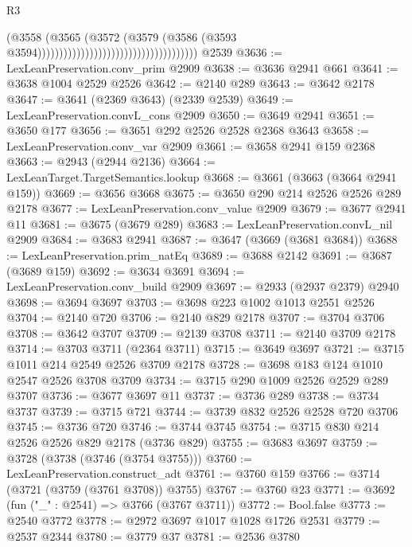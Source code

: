 \begin{lexlean}{R3}
\begin{coremodule}
                                                                  (@3558
                                                                    (@3565
                                                                      (@3572
                                                                        (@3579
                                                                          (@3586
                                                                            (@3593
                                                                              @3594)))))))))))))))))))))))))))))))))))))
    @2539
@3636 := LexLeanPreservation.conv_prim @2909
@3638 := @3636 @2941 @661
@3641 := @3638 @1004 @2529 @2526
@3642 := @2140 @289
@3643 := @3642 @2178
@3647 := @3641 (@2369 @3643) (@2339 @2539)
@3649 := LexLeanPreservation.convL_cons @2909
@3650 := @3649 @2941
@3651 := @3650 @177
@3656 := @3651 @292 @2526 @2528 @2368 @3643
@3658 := LexLeanPreservation.conv_var @2909
@3661 := @3658 @2941 @159 @2368
@3663 := @2943 (@2944 @2136)
@3664 := LexLeanTarget.TargetSemantics.lookup
@3668 := @3661 (@3663 (@3664 @2941 @159))
@3669 := @3656 @3668
@3675 := @3650 @290 @214 @2526 @2526 @289 @2178
@3677 := LexLeanPreservation.conv_value @2909
@3679 := @3677 @2941 @11
@3681 := @3675 (@3679 @289)
@3683 := LexLeanPreservation.convL_nil @2909
@3684 := @3683 @2941
@3687 := @3647 (@3669 (@3681 @3684))
@3688 := LexLeanPreservation.prim_natEq
@3689 := @3688 @2142
@3691 := @3687 (@3689 @159)
@3692 := @3634 @3691
@3694 := LexLeanPreservation.conv_build @2909
@3697 := @2933 (@2937 @2379) @2940
@3698 := @3694 @3697
@3703 := @3698 @223 @1002 @1013 @2551 @2526
@3704 := @2140 @720
@3706 := @2140 @829 @2178
@3707 := @3704 @3706
@3708 := @3642 @3707
@3709 := @2139 @3708
@3711 := @2140 @3709 @2178
@3714 := @3703 @3711 (@2364 @3711)
@3715 := @3649 @3697
@3721 := @3715 @1011 @214 @2549 @2526 @3709 @2178
@3728 := @3698 @183 @124 @1010 @2547 @2526 @3708 @3709
@3734 := @3715 @290 @1009 @2526 @2529 @289 @3707
@3736 := @3677 @3697 @11
@3737 := @3736 @289
@3738 := @3734 @3737
@3739 := @3715 @721
@3744 := @3739 @832 @2526 @2528 @720 @3706
@3745 := @3736 @720
@3746 := @3744 @3745
@3754 := @3715 @830 @214 @2526 @2526 @829 @2178 (@3736 @829)
@3755 := @3683 @3697
@3759 := @3728 (@3738 (@3746 (@3754 @3755)))
@3760 := LexLeanPreservation.construct_adt
@3761 := @3760 @159
@3766 := @3714 (@3721 (@3759 (@3761 @3708)) @3755)
@3767 := @3760 @23
@3771 := @3692 (fun ("_" : @2541) => @3766 (@3767 @3711))
@3772 := Bool.false
@3773 := @2540 @3772
@3778 := @2972 @3697 @1017 @1028 @1726 @2531
@3779 := @2537 @2344
@3780 := @3779 @37
@3781 := @2536 @3780

\end{coremodule}
\end{lexlean}
